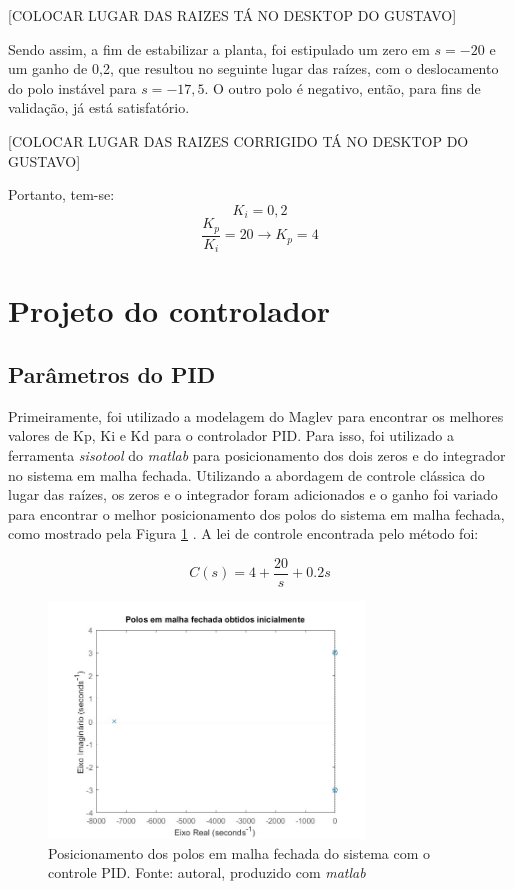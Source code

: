 \documentclass{ifacconf}
\begin{document}
[COLOCAR LUGAR DAS RAIZES TÁ NO DESKTOP DO GUSTAVO]

Sendo assim, a fim de estabilizar a planta, foi estipulado um zero em $s = -20$ e um ganho de 0,2, que resultou no seguinte lugar das raízes, com o deslocamento do polo instável para $s = -17,5$. O outro polo é negativo, então, para fins de validação, já está satisfatório.

[COLOCAR LUGAR DAS RAIZES CORRIGIDO TÁ NO DESKTOP DO GUSTAVO]

Portanto, tem-se:
\begin{equation}
    K_i = 0,2
\end{equation}
\begin{equation}
    \frac{K_p}{K_i} = 20 \rightarrow K_p = 4
\end{equation}

\section{Projeto do controlador}
 
\subsection{Parâmetros do PID}
Primeiramente, foi utilizado a modelagem do Maglev para encontrar os melhores valores de Kp, Ki e Kd para o controlador PID.
Para isso, foi utilizado a ferramenta \textit{sisotool} do \textit{matlab} para posicionamento dos dois zeros e do integrador no sistema em malha fechada.
Utilizando a abordagem de controle clássica do lugar das raízes, os zeros e o integrador foram adicionados e o ganho foi variado para encontrar o melhor posicionamento 
dos polos do sistema em malha fechada, como mostrado pela Figura \ref{fig:pid_inicial} . A lei de controle encontrada pelo método foi:

\begin{equation}
  C(s) = 4 + \frac{20}{s} + 0.2s
  \label{equa: controle inicial}
\end{equation}

\begin{figure}[!htb]
  \begin{center}
  \includegraphics[width=8.4cm]{figures/lei pid inicial.jpg}    %
  \caption{Posicionamento dos polos em malha fechada do sistema com o controle PID. Fonte: autoral, produzido com \textit{matlab}} 
  \label{fig:pid_inicial}
  \end{center}
\end{figure}
\end{document}
